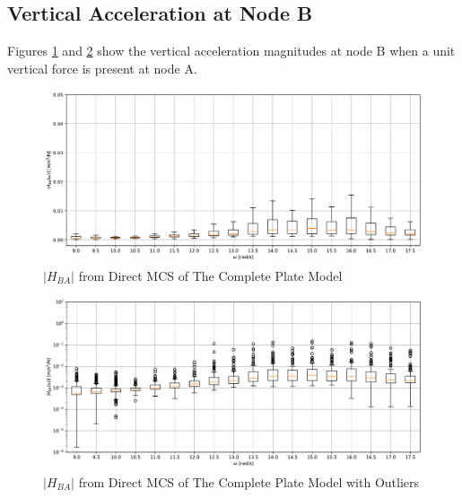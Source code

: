 %
%

\subsection{Vertical Acceleration at Node B}
\label{ssec: cms point B}

Figures \ref{FRF_MC_B_A_linear} and \ref{FRF_MC_B_A_log} show the vertical acceleration magnitudes at node B when a unit vertical force is present at node A.
\begin{figure}[H]
    \centering
    \includegraphics[width=1.0\textwidth]{
        plots/substructuring/plot_8_linear.pdf
    }
    \caption{%
        $\left|H_{BA}\right|$ from Direct MCS of The Complete Plate Model
    }
    \label{FRF_MC_B_A_linear}
\end{figure}
\begin{figure}[H]
    \centering
    \includegraphics[width=1.0\textwidth]{
        plots/substructuring/plot_8_log.pdf
    }
    \caption{%
        $\left|H_{BA}\right|$ from Direct MCS of The Complete Plate Model with Outliers
    }
    \label{FRF_MC_B_A_log}
\end{figure}
